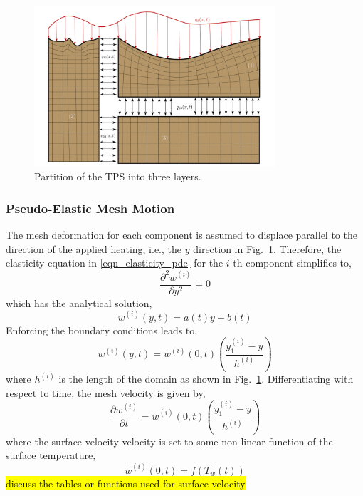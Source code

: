 \begin{figure}
    \centering
    \includegraphics[width=0.8\textwidth]{./figs/three_components.png}
    \caption{Partition of the TPS into three layers.}
    \label{fig_lcm_domain}
\end{figure}

\subsubsection{Pseudo-Elastic Mesh Motion}

The mesh deformation for each component is assumed to displace parallel to the direction of the applied heating, i.e., the $y$ direction in Fig.~\ref{fig_lcm_domain}. Therefore, the elasticity equation in \cref{eqn_elasticity_pde} for the $i$-th component simplifies to,
\begin{equation}
    \frac{\partial^2 w^{(i)}}{\partial y^2} = 0
\end{equation}
which has the analytical solution,
\begin{equation}
    w^{(i)}(y,t) = a(t)y + b(t)
\end{equation}
Enforcing the boundary conditions leads to,
\begin{equation}
    w^{(i)}(y,t) = w^{(i)}(0,t)\left(\frac{y_1^{(i)} - y}{h^{(i)}}\right)
\end{equation}
where $h^{(i)}$ is the length of the domain as shown in Fig.~\ref{fig_lcm_domain}. Differentiating with respect to time, the mesh velocity is given by,
\begin{equation}
    \frac{\partial w^{(i)}}{\partial t} = \dot{w}^{(i)}(0,t) \left(\frac{y_1^{(i)} - y}{h^{(i)}}\right)
\end{equation}
where the surface velocity velocity is set to some non-linear function of the surface temperature,
\begin{equation}
    \dot{w}^{(i)}(0,t) = f(T_w(t))
\end{equation}
\hl{discuss the tables or functions used for surface velocity}

